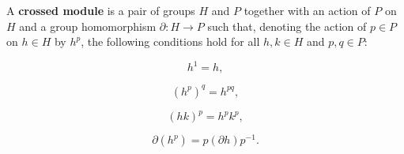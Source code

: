 A \textbf{crossed module} is a pair of groups $H$ and $P$ together with an action of $P$ on $H$ and a group homomorphism $\partial : H \rightarrow P$ such that, denoting the action of $p \in P$ on $h \in H$ by $h^p$, the following conditions hold for all $h, k \in H$ and $p, q \in P$:

$$h^1 = h,$$

$$(h^p)^q = h^{pq},$$

$$(hk)^p = h^p k^p,$$

$$\partial(h^p) = p (\partial h) p^{-1}.$$
